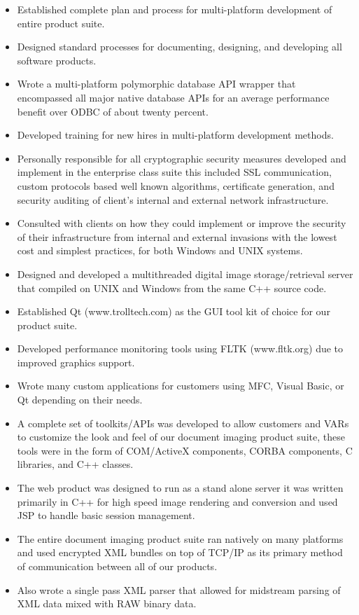 \documentclass[10pt]{report}
\begin{document}
\begin{itemize}
\item Established complete plan and process for multi-platform development of entire product suite.
\item Designed standard processes for documenting, designing, and developing all software products.
\item Wrote a multi-platform polymorphic database API wrapper that encompassed all major native database APIs for an average performance benefit over ODBC of about twenty percent.
\item Developed training for new hires in multi-platform development methods.
\item Personally responsible for all cryptographic security measures developed and implement in the enterprise class suite this included SSL communication, custom protocols based well known algorithms, certificate generation, and security auditing of client’s internal and external network infrastructure.
\item Consulted with clients on how they could implement or improve the security of their infrastructure from internal and external invasions with the lowest cost and simplest practices, for both Windows and UNIX systems.
\item Designed and developed a multithreaded digital image storage/retrieval server that compiled on UNIX and Windows from the same C++ source code.
\item Established Qt (www.trolltech.com) as the GUI tool kit of choice for our product suite.
\item Developed performance monitoring tools using FLTK (www.fltk.org) due to improved graphics support.
\item Wrote many custom applications for customers using MFC, Visual Basic, or Qt depending on their needs.
\item A complete set of toolkits/APIs was developed to allow customers and VARs to customize the look and feel of our document imaging product suite, these tools were in the form of COM/ActiveX components, CORBA components, C libraries, and C++ classes.
\item The web product was designed to run as a stand alone server it was written primarily in C++ for high speed image rendering and conversion and used JSP to handle basic session management.
\item The entire document imaging product suite ran natively on many platforms and used encrypted XML bundles on top of TCP/IP as its primary method of communication between all of our products.
\item Also wrote a single pass XML parser that allowed for midstream parsing of XML data mixed with RAW binary data.
\end{itemize}
\bigskip
\end{document}
